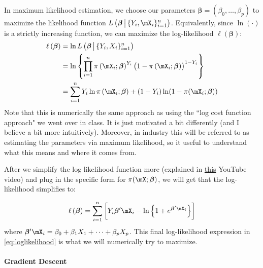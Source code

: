 \documentclass[10pt]{article}
\begin{document}
In maximum likelihood estimation, we choose our parameters \(\boldsymbol{\beta} = \left(\beta_0, \dots, \beta_p\right)\) to maximize the likelihood function \(L\left(\boldsymbol{\beta}\,\middle|\,\{Y_i,\mX_i\}_{i=1}^n \right)\). Equivalently, since \(\ln(\cdot)\) is a strictly increasing function, we can maximize the log-likelihood \(\ell(\boldsymbol{\beta})\):
\begin{align*}
	\ell\left(\boldsymbol{\beta}\right) &= \ln L\left(\boldsymbol{\beta}\,\middle|\,\{Y_i,X_i\}_{i=1}^n \right) \\ 
										&= \ln\left\{\prod_{i=1}^n \pi\left(\mX_i;\boldsymbol{\beta}\right)^{Y_i}\left(1 - \pi\left(\mX_i ; \boldsymbol{\beta}\right)\right)^{1-Y_i}\right\} \\
										&= \sum_{i=1}^n Y_i\ln\pi\left(\mX_i ;\boldsymbol{\beta}\right) + (1 - Y_i)\ln(1 - \pi(\mX_i;\boldsymbol{\beta}))
\end{align*}
Note that this is numerically the same approach as using the ``log cost function approach" we went over in class. It is just motivated a bit differently (and I believe a bit more intuitively). Moreover, in industry this will be referred to as estimating the parameters via maximum likelihood, so it useful to understand what this means and where it comes from. 

After we simplify the log likelihood function more (explained in \href{https://www.youtube.com/watch?v=YMJtsYIp4kg&t=351s}{this} YouTube video) and plug in the specific form for \(\pi(\mX;\boldsymbol{\beta})\), we will get that the log-likelihood simplifies to:

\begin{equation}
	\label{eq:loglikelihood}
	\ell\left(\boldsymbol{\beta}\right) = \sum_{i=1}^n \left[ Y_i\boldsymbol{\beta}'\mX_i -\ln\left\{1 + e^{\boldsymbol{\beta}'\mX_i}\right\}\right]
\end{equation}
where \(\boldsymbol{\beta}'\mX_i = \beta_0 + \beta_1X_1 + \dots + \beta_p X_p\). This final log-likelihood expression in \eqref{eq:loglikelihood} is what we will numerically try to maximize. 

\paragraph{Gradient Descent}
\end{document}
